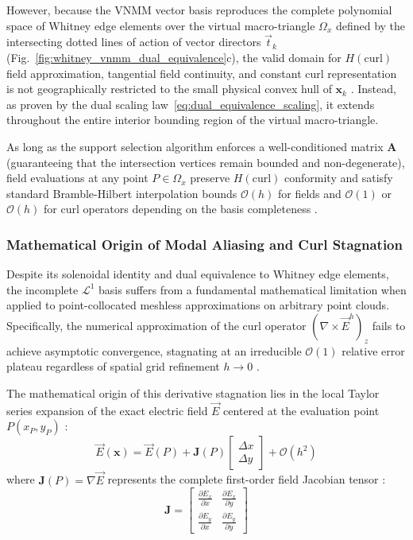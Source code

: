 \documentclass[preprint,12pt]{elsarticle}
\begin{document}
However, because the VNMM vector basis reproduces the complete polynomial space of Whitney edge elements over the virtual macro-triangle $\Omega_{x}$ defined by the intersecting dotted lines of action of vector directors $\vec{t}_k$ (Fig.~\ref{fig:whitney_vnmm_dual_equivalence}c), the valid domain for $H(\mathrm{curl})$ field approximation, tangential field continuity, and constant curl representation is not geographically restricted to the small physical convex hull of $\mathbf{x}_k$ \cite{nedelec1980mixed, monk2003finite}. Instead, as proven by the dual scaling law~\eqref{eq:dual_equivalence_scaling}, it extends throughout the entire interior bounding region of the virtual macro-triangle. 

As long as the support selection algorithm enforces a well-conditioned matrix $\mathbf{A}$ (guaranteeing that the intersection vertices remain bounded and non-degenerate), field evaluations at any point $P \in \Omega_{x}$ preserve $H(\mathrm{curl})$ conformity and satisfy standard Bramble-Hilbert interpolation bounds $\mathcal{O}(h)$ for fields and $\mathcal{O}(1)$ or $\mathcal{O}(h)$ for curl operators depending on the basis completeness \cite{monk2003finite}.

\subsubsection{Mathematical Origin of Modal Aliasing and Curl Stagnation}
\label{subsec:L1_aliasing_analysis}

Despite its solenoidal identity and dual equivalence to Whitney edge elements, the incomplete $\mathcal{L}^1$ basis suffers from a fundamental mathematical limitation when applied to point-collocated meshless approximations on arbitrary point clouds. Specifically, the numerical approximation of the curl operator $(\nabla \times \vec{E}^h)_z$ fails to achieve asymptotic convergence, stagnating at an irreducible $\mathcal{O}(1)$ relative error plateau regardless of spatial grid refinement $h \to 0$ \cite{goncalves2025tese}.

The mathematical origin of this derivative stagnation lies in the local Taylor series expansion of the exact electric field $\vec{E}$ centered at the evaluation point $P(x_P, y_P)$ \cite{li2007meshfree, liu2009mesh}:
\begin{equation}
\vec{E}(\mathbf{x}) = \vec{E}(P) + \mathbf{J}(P) \begin{bmatrix} \Delta x \\[2pt] \Delta y \end{bmatrix} + \mathcal{O}(h^2)
\label{eq:taylor_vector_expansion}
\end{equation}
where $\mathbf{J}(P) = \nabla \vec{E}$ represents the complete first-order field Jacobian tensor \cite{liu2009mesh}:
\begin{equation}
\mathbf{J} = \begin{bmatrix} 
\frac{\partial E_x}{\partial x} & \frac{\partial E_x}{\partial y} \\[4pt]
\frac{\partial E_y}{\partial x} & \frac{\partial E_y}{\partial y} 
\end{bmatrix}
\label{eq:jacobian_tensor_raw}
\end{equation}
\end{document}
